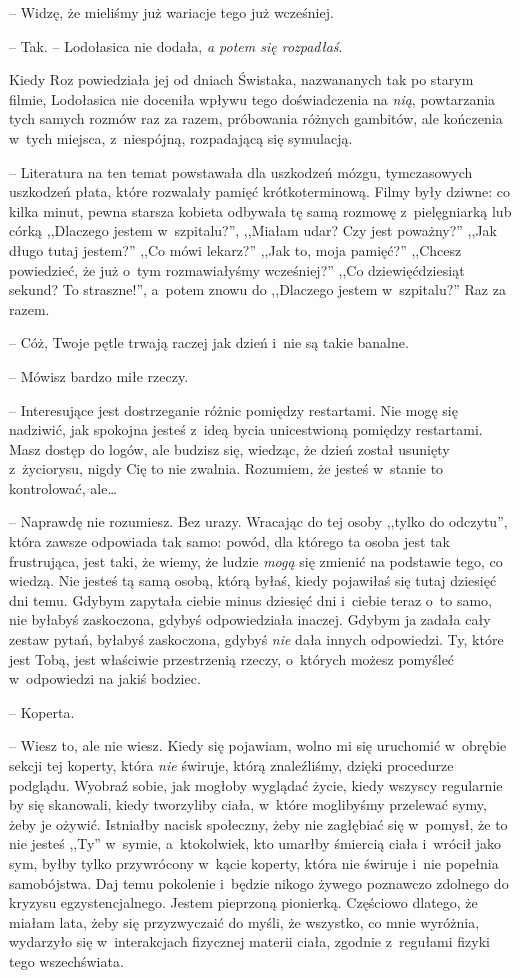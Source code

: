 \documentclass[oneside,polish,11pt,sfheadings]{mwbk}
\begin{document}
-- Widzę, że mieliśmy już wariacje tego już wcześniej.

-- Tak. -- Lodołasica nie dodała, \textit{a potem się rozpadłaś}.

Kiedy Roz powiedziała jej od dniach Świstaka, nazwananych tak po starym
filmie, Lodołasica nie doceniła wpływu tego doświadczenia na \textit{nią},
powtarzania tych samych rozmów raz za razem, próbowania różnych
gambitów, ale kończenia w~tych miejsca, z~niespójną, rozpadającą się
symulacją.

-- Literatura na ten temat powstawała dla uszkodzeń mózgu, tymczasowych
uszkodzeń płata, które rozwalały pamięć krótkoterminową. Filmy były
dziwne: co kilka minut, pewna starsza kobieta odbywała tę samą rozmowę z~pielęgniarką lub córką ,,Dlaczego jestem w~szpitalu?'', ,,Miałam udar?
Czy jest poważny?'' ,,Jak długo tutaj jestem?'' ,,Co mówi lekarz?''
,,Jak to, moja pamięć?'' ,,Chcesz powiedzieć, że już o~tym rozmawiałyśmy
wcześniej?'' ,,Co dziewięćdziesiąt sekund? To straszne!'', a~potem znowu
do ,,Dlaczego jestem w~szpitalu?'' Raz za razem.

-- Cóż, Twoje pętle trwają raczej jak dzień i~nie są takie banalne.

-- Mówisz bardzo miłe rzeczy.

-- Interesujące jest dostrzeganie różnic pomiędzy restartami. Nie mogę
się nadziwić, jak spokojna jesteś z~ideą bycia unicestwioną pomiędzy
restartami. Masz dostęp do logów, ale budzisz się, wiedząc, że dzień
został usunięty z~życiorysu, nigdy Cię to nie zwalnia. Rozumiem, że
jesteś w~stanie to kontrolować, ale\ldots 

-- Naprawdę nie rozumiesz. Bez urazy. Wracając do tej osoby ,,tylko do
odczytu'', która zawsze odpowiada tak samo: powód, dla którego ta osoba
jest tak frustrująca, jest taki, że wiemy, że ludzie \textit{mogą} się
zmienić na podstawie tego, co wiedzą. Nie jesteś tą samą osobą, którą
byłaś, kiedy pojawiłaś się tutaj dziesięć dni temu. Gdybym zapytała
ciebie minus dziesięć dni i~ciebie teraz o~to samo, nie byłabyś
zaskoczona, gdybyś odpowiedziała inaczej. Gdybym ja zadała cały zestaw
pytań, byłabyś zaskoczona, gdybyś \textit{nie} dała innych odpowiedzi. Ty,
które jest Tobą, jest właściwie przestrzenią rzeczy, o~których możesz
pomyśleć w~odpowiedzi na jakiś bodziec.

-- Koperta.

-- Wiesz to, ale nie wiesz. Kiedy się pojawiam, wolno mi się uruchomić w~obrębie sekcji tej koperty, która \textit{nie} świruje, którą znaleźliśmy,
dzięki procedurze podglądu. Wyobraź sobie, jak mogłoby wyglądać życie,
kiedy wszyscy regularnie by się skanowali, kiedy tworzyliby ciała, w~które moglibyśmy przelewać symy, żeby je ożywić. Istniałby nacisk
społeczny, żeby nie zagłębiać się w~pomysł, że to nie jesteś ,,Ty'' w~symie, a~ktokolwiek, kto umarłby śmiercią ciała i~wrócił jako sym, byłby
tylko przywrócony w~kącie koperty, która nie świruje i~nie popełnia
samobójstwa. Daj temu pokolenie i~będzie nikogo żywego poznawczo
zdolnego do kryzysu egzystencjalnego. Jestem pieprzoną pionierką.
Częściowo dlatego, że miałam lata, żeby się przyzwyczaić do myśli, że
wszystko, co mnie wyróżnia, wydarzyło się w~interakcjach fizycznej
materii ciała, zgodnie z~regułami fizyki tego wszechświata.
\end{document}
